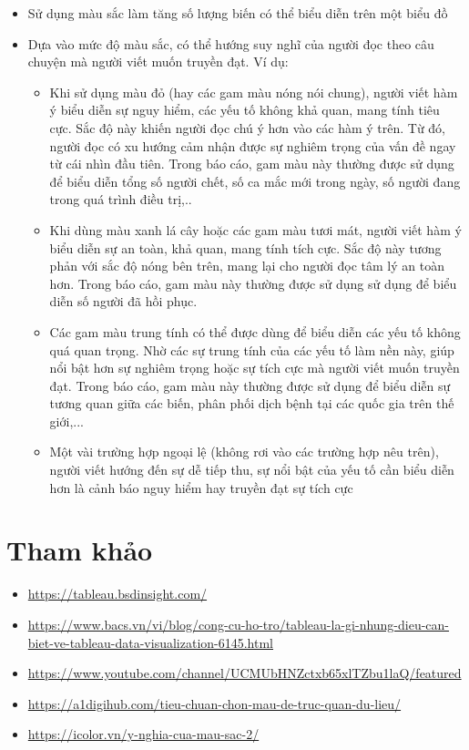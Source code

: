 \documentclass[a4paper, 12pt]{article}
\begin{document}
\begin{itemize}
    \item Sử dụng màu sắc làm tăng số lượng biến có thể biểu diễn trên một biểu đồ
    \item Dựa vào mức độ màu sắc, có thể hướng suy nghĩ của người đọc theo câu chuyện mà người viết muốn truyền đạt. Ví dụ:
    \begin{itemize}
        \item Khi sử dụng màu đỏ (hay các gam màu nóng nói chung), người viết hàm ý biểu diễn sự nguy hiểm, các yếu tố không khả quan, mang tính tiêu cực. Sắc độ này khiến người đọc chú ý hơn vào các hàm ý trên. Từ đó, người đọc có xu hướng cảm nhận được sự nghiêm trọng của vấn đề ngay từ cái nhìn đầu tiên. Trong báo cáo, gam màu này thường được sử dụng để biểu diễn tổng số người chết, số ca mắc mới trong ngày, số người đang trong quá trình điều trị,..
        \item Khi dùng màu xanh lá cây hoặc các gam màu tươi mát, người viết hàm ý biểu diễn sự an toàn, khả quan, mang tính tích cực. Sắc độ này tương phản với sắc độ nóng bên trên, mang lại cho người đọc tâm lý an toàn hơn. Trong báo cáo, gam màu này thường được sử dụng sử dụng để biểu diễn số người đã hồi phục. 
        \item Các gam màu trung tính có thể được dùng để biểu diễn các yếu tố không quá quan trọng. Nhờ các sự trung tính của các yếu tố làm nền này, giúp nổi bật hơn sự nghiêm trọng hoặc sự tích cực mà người viết muốn truyền đạt. Trong báo cáo, gam màu này thường được sử dụng để biểu diễn sự tương quan giữa các biến, phân phối dịch bệnh tại các quốc gia trên thế giới,...
        \item Một vài trường hợp ngoại lệ (không rơi vào các trường hợp nêu trên), người viết hướng đến sự dễ tiếp thu, sự nổi bật của yếu tố cần biểu diễn hơn là cảnh báo nguy hiểm hay truyền đạt sự tích cực
    \end{itemize}
\end{itemize}

\clearpage

\section{Tham khảo}

\begin{itemize}
    \item \url{https://tableau.bsdinsight.com/}
    \item \url{https://www.bacs.vn/vi/blog/cong-cu-ho-tro/tableau-la-gi-nhung-dieu-can-biet-ve-tableau-data-visualization-6145.html}
    \item \url{https://www.youtube.com/channel/UCMUbHNZctxb65xlTZbu1laQ/featured}
    \item \url{https://a1digihub.com/tieu-chuan-chon-mau-de-truc-quan-du-lieu/}
    \item \url{https://icolor.vn/y-nghia-cua-mau-sac-2/}
\end{itemize}
\end{document}
